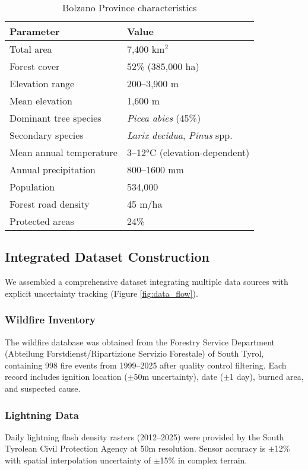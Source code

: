 \documentclass[11pt,a4paper]{article}
\begin{document}
\begin{table}[H]
\centering
\caption{Bolzano Province characteristics}
\label{tab:study_area}
\begin{tabular}{ll}
\toprule
\textbf{Parameter} & \textbf{Value} \\
\midrule
Total area & 7,400 km$^2$ \\
Forest cover & 52\% (385,000 ha) \\
Elevation range & 200--3,900 m \\
Mean elevation & 1,600 m \\
Dominant tree species & \textit{Picea abies} (45\%) \\
Secondary species & \textit{Larix decidua}, \textit{Pinus} spp. \\
Mean annual temperature & 3--12°C (elevation-dependent) \\
Annual precipitation & 800--1600 mm \\
Population & 534,000 \\
Forest road density & 45 m/ha \\
Protected areas & 24\% \\
\bottomrule
\end{tabular}
\end{table}

\subsection{Integrated Dataset Construction}

We assembled a comprehensive dataset integrating multiple data sources with explicit uncertainty tracking (Figure \ref{fig:data_flow}). 

\subsubsection{Wildfire Inventory}

The wildfire database was obtained from the Forestry Service Department (Abteilung Forstdienst/Ripartizione Servizio Forestale) of South Tyrol, containing 998 fire events from 1999--2025 after quality control filtering. Each record includes ignition location ($\pm$50m uncertainty), date ($\pm$1 day), burned area, and suspected cause.

\subsubsection{Lightning Data}

Daily lightning flash density rasters (2012--2025) were provided by the South Tyrolean Civil Protection Agency at 50m resolution. Sensor accuracy is $\pm$12\% with spatial interpolation uncertainty of $\pm$15\% in complex terrain.
\end{document}
